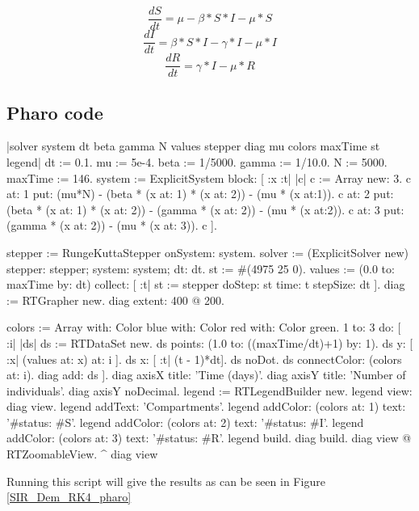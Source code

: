 \documentclass[a4paper,10pt,twoside]{book}
\begin{document}
\begin{equation}
\frac{dS}{dt} = \mu-\beta*S*I-\mu*S
\end{equation}
\begin{equation}
\frac{dI}{dt} = \beta*S*I-\gamma*I-\mu*I
\end{equation}
\begin{equation}
\frac{dR}{dt} = \gamma*I-\mu*R
\end{equation}
\subsection{ Pharo code}

\begin{code}{}
|solver system dt beta gamma N values stepper diag mu colors maxTime st legend|
dt := 0.1.
mu := 5e-4.
beta := 1/5000.
gamma := 1/10.0.
N := 5000.
maxTime := 146.
system := ExplicitSystem block: [ :x :t| |c|
     c := Array new: 3.
     c at: 1 put: (mu*N) - (beta  * (x at: 1) * (x at: 2)) - (mu * (x at:1)).
     c at: 2 put: (beta * (x at: 1) * (x at: 2)) - (gamma * (x at: 2)) - (mu * (x at:2)).
     c at: 3 put: (gamma * (x at: 2)) - (mu * (x at: 3)).
     c
     ].

stepper := RungeKuttaStepper onSystem: system.
solver := (ExplicitSolver new) stepper: stepper; system: system; dt: dt.
st := #(4975 25 0).
values := (0.0 to: maxTime by: dt) collect: [ :t| st := stepper doStep: st
                                                          time: t stepSize: dt ].
diag := RTGrapher new.
diag extent: 400 @ 200.

colors := Array with: Color blue with: Color red with: Color green.
1 to: 3 do: [ :i|
	|ds|
	ds := RTDataSet new.
	ds points: (1.0 to: ((maxTime/dt)+1) by: 1).
	ds y: [ :x| (values at: x) at: i ].
	ds x: [ :t| (t - 1)*dt].
	ds noDot.
	ds connectColor: (colors at: i).
	diag add: ds ].
diag axisX title: 'Time (days)'.
diag axisY title: 'Number of individuals'.
diag axisY noDecimal.
legend := RTLegendBuilder new.
legend view: diag view.
legend addText: 'Compartments'.
legend addColor: (colors at: 1) text: '#status: #S'.
legend addColor: (colors at: 2) text: '#status: #I'.
legend addColor: (colors at: 3) text: '#status: #R'.
legend build.
diag build.
diag view @ RTZoomableView.
^ diag view
\end{code}

Running this script will give the results as can be seen in Figure \ref{SIR_Dem_RK4_pharo}
\end{document}
